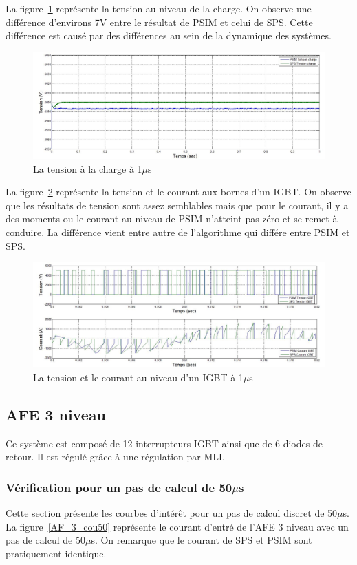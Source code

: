 \documentclass[11pt,letterpaper,final]{report}
\begin{document}
La figure~\ref{AF_RC_ten} représente la tension au niveau de la charge. On observe une différence d'environs 7V entre le résultat de PSIM et celui de SPS. Cette différence est causé par des différences au sein de la dynamique des systèmes.


\begin{figure}[htb]
\centering
\includegraphics[scale=0.5]{Fig/AFERC/vch.jpg}
\caption{La tension à la charge à 1$\mu$s}
\label{AF_RC_ten}
\end{figure}

La figure~\ref{AF_RC_igbt} représente la tension et le courant aux bornes d'un IGBT. On observe que les résultats de tension sont assez semblables mais que pour le courant, il y a des moments ou le courant au niveau de PSIM n'atteint pas zéro et se remet à conduire. La différence vient entre autre de l'algorithme qui différe entre PSIM et SPS.

\begin{figure}[htb]
\centering
\includegraphics[scale=0.5]{Fig/AFERC/IGBT.jpg}
\caption{La tension et le courant au niveau d'un IGBT à 1$\mu$s}
\label{AF_RC_igbt}
\end{figure}


\clearpage
\subsection{AFE 3 niveau}
Ce système est composé de 12 interrupteurs IGBT ainsi que de 6 diodes de retour. Il est régulé grâce à une régulation par MLI.

\subsubsection{Vérification pour un pas de calcul de 50$\mu$s}
Cette section présente les courbes d'intérêt pour un pas de calcul discret de 50$\mu$s. La figure~\ref{AF_3_cou50} représente le courant d'entré de l'AFE 3 niveau avec un pas de calcul de 50$\mu$s. On remarque que le courant de SPS et PSIM sont pratiquement identique. 
\end{document}
